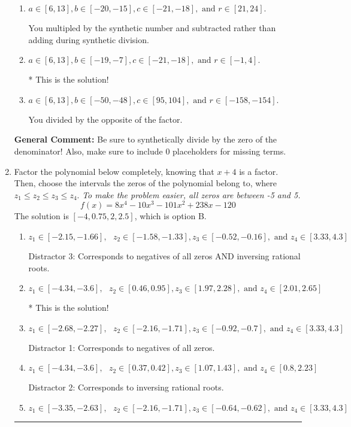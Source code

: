 \documentclass{extbook}[14pt]
\newcommand{\litem}[1]{\item #1

\rule{\textwidth}{0.4pt}}
\begin{document}
\begin{enumerate}
{\begin{enumerate}[label=\Alph*.]
 You divided by the opposite of the factor AND multipled the first factor rather than just bringing it down.
\item \( a \in [6, 13], b \in [-20, -15], c \in [-21, -18], \text{ and } r \in [21, 24]. \)

 You multipled by the synthetic number and subtracted rather than adding during synthetic division.
\item \( a \in [6, 13], b \in [-19, -7], c \in [-21, -18], \text{ and } r \in [-1, 4]. \)

* This is the solution!
\item \( a \in [6, 13], b \in [-50, -48], c \in [95, 104], \text{ and } r \in [-158, -154]. \)

 You divided by the opposite of the factor.
\end{enumerate}

\textbf{General Comment:} Be sure to synthetically divide by the zero of the denominator! Also, make sure to include 0 placeholders for missing terms.
}
\litem{
Factor the polynomial below completely, knowing that $x + 4$ is a factor. Then, choose the intervals the zeros of the polynomial belong to, where $z_1 \leq z_2 \leq z_3 \leq z_4$. \textit{To make the problem easier, all zeros are between -5 and 5.}
\[ f(x) = 8x^{4} -10 x^{3} -101 x^{2} +238 x -120 \]The solution is \( [-4, 0.75, 2, 2.5] \), which is option B.\begin{enumerate}[label=\Alph*.]
\item \( z_1 \in [-2.15, -1.66], \text{   }  z_2 \in [-1.58, -1.33], z_3 \in [-0.52, -0.16], \text{   and   } z_4 \in [3.33, 4.3] \)

 Distractor 3: Corresponds to negatives of all zeros AND inversing rational roots.
\item \( z_1 \in [-4.34, -3.6], \text{   }  z_2 \in [0.46, 0.95], z_3 \in [1.97, 2.28], \text{   and   } z_4 \in [2.01, 2.65] \)

* This is the solution!
\item \( z_1 \in [-2.68, -2.27], \text{   }  z_2 \in [-2.16, -1.71], z_3 \in [-0.92, -0.7], \text{   and   } z_4 \in [3.33, 4.3] \)

 Distractor 1: Corresponds to negatives of all zeros.
\item \( z_1 \in [-4.34, -3.6], \text{   }  z_2 \in [0.37, 0.42], z_3 \in [1.07, 1.43], \text{   and   } z_4 \in [0.8, 2.23] \)

 Distractor 2: Corresponds to inversing rational roots.
\item \( z_1 \in [-3.35, -2.63], \text{   }  z_2 \in [-2.16, -1.71], z_3 \in [-0.64, -0.62], \text{   and   } z_4 \in [3.33, 4.3] \)


\end{enumerate}}
\end{enumerate}
\end{document}
